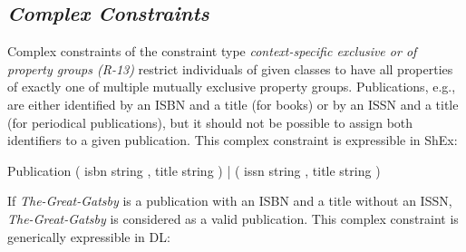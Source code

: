 \documentclass[a4paper,fontsize=11pt]{scrartcl}
\newcommand{\ms}[1]{\texttt{#1}}
\begin{document}
\subsection{\emph{Complex Constraints}}

Complex constraints of the constraint type \emph{context-specific exclusive or of property groups (R-13)} restrict individuals of given classes to have all properties of exactly one of multiple mutually exclusive property groups. Publications, e.g., are either identified by an ISBN and a title (for books) or by an ISSN and a title (for periodical publications), but it should not be possible to assign both identifiers to a given publication. This complex constraint is expressible in ShEx: 

\begin{ex}
Publication { 
    ( isbn string , title string ) |
    ( issn string , title string ) }
\end{ex}

If \emph{The-Great-Gatsby} is a publication with an ISBN and a title without an ISSN, \emph{The-Great-Gatsby} is considered as a valid publication. This complex constraint is generically expressible in DL:





\end{document}
